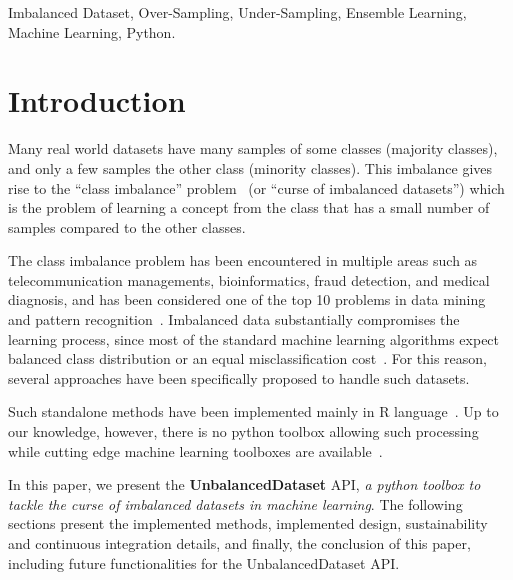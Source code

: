 \documentclass[twoside,11pt]{article}
\begin{document}
\begin{keywords}
Imbalanced Dataset, Over-Sampling, Under-Sampling, Ensemble Learning, Machine Learning, Python.
\end{keywords}

\section{Introduction}

Many real world datasets have many samples of some classes (majority classes),
and only a few samples the other class (minority classes). This imbalance gives
rise to the ``class imbalance'' problem~\citep{prati2009data} (or ``curse of imbalanced datasets'')
which is the problem of learning a concept from the class that has a small number of samples compared
to the other classes. 

The class imbalance problem has been encountered in multiple areas such as 
telecommunication managements, bioinformatics, fraud detection, and medical diagnosis,
and has been considered one of the top 10 problems in data mining and 
pattern recognition~\citep{rastgoo2016tackling,yang200610}. 
Imbalanced data substantially compromises the learning process, since most of the 
standard machine learning algorithms expect balanced class distribution or an 
equal misclassification cost~\citep{he2009learning}. For this reason, several
approaches have been specifically proposed to handle such datasets.

Such standalone methods have been implemented mainly in R language~\citep{torgo2010data,kuhn2015caret,dal2013racing}.
Up to our knowledge, however, there is no python toolbox allowing such processing while cutting edge machine learning toolboxes are available~\citep{pedregosa2011scikit,sonnenburg2010shogun}.

In this paper, we present the \textbf{UnbalancedDataset} API, 
\textit{a python toolbox to tackle the curse of imbalanced datasets
in machine learning}. The following sections present the implemented
methods, implemented design, sustainability and continuous integration details,
and finally, the conclusion of this paper, including future functionalities
for the UnbalancedDataset API.

\end{document}
